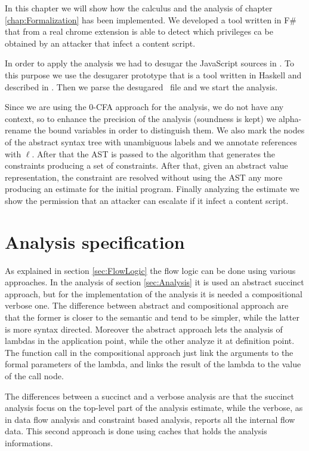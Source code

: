 In this chapter we will show how the calculus and the analysis of chapter \ref{chap:Formalization} has been implemented. We developed a tool written in F\# that from a real chrome extension is able to detect which privileges ca be obtained by an attacker that infect a content script.

In order to apply the analysis we had to desugar the JavaScript sources in \ljs. To this purpose we use the desugarer prototype that is a tool written in Haskell and described in \cite{LambdaJS}. Then we parse the desugared \ljs\ file and we start the analysis.

Since we are using the 0-CFA approach for the analysis, we do not have any context, so to enhance the precision of the analysis (soundness is kept) we alpha-rename the bound variables in order to distinguish them. We also mark the nodes of the abstract syntax tree with unambiguous labels and we annotate references with $\ell$. After that the AST is passed to the algorithm that generates the constraints producing a set of constraints. After that, given an abstract value representation, the constraint are resolved without using the AST any more producing an estimate for the initial program.
Finally analyzing the estimate we show the permission that an attacker can escalate if it infect a content script.


\section{Analysis specification}
\label{sec:AnalysisSpec}
As explained in section \ref{sec:FlowLogic} the flow logic can be done using various approaches. In the analysis of section \ref{sec:Analysis} it is used an abstract succinct approach, but for the implementation of the analysis it is needed a compositional verbose one. The difference between abstract and compositional approach are that the former is closer to the semantic and tend to be simpler, while the latter is more syntax directed. Moreover the abstract approach lets the analysis of lambdas in the application point, while the other analyze it at definition point. The function call in the compositional approach just link the arguments to the formal parameters of the lambda, and links the result of the lambda to the value of the call node.

The differences between a succinct and a verbose analysis are that the succinct analysis focus on the top-level part of the analysis estimate, while the verbose, as in data flow analysis and constraint based analysis, reports all the internal flow data. This second approach is done using caches that holds the analysis informations. 

